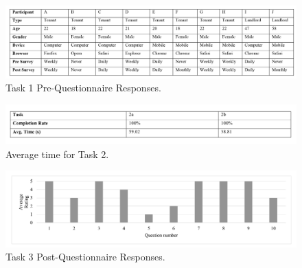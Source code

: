 \documentclass[12pt]{article}
\begin{document}
\begin{figure}[h]
    \centering
    \includegraphics[width=1\textwidth]{figures/participants.png}
    \caption{Task 1 Pre-Questionnaire Responses.}
    \label{fig:participants}
\end{figure}

\begin{figure}[h]
    \centering
    \includegraphics[width=1\textwidth]{figures/task2.png}
    \caption{Average time for Task 2.}
    \label{fig:task2}
\end{figure}

\begin{figure}[h]
    \centering
    \includegraphics[width=1\textwidth]{figures/task3.png}
    \caption{Task 3 Post-Questionnaire Responses.}
    \label{fig:task3}
\end{figure}
\end{document}
